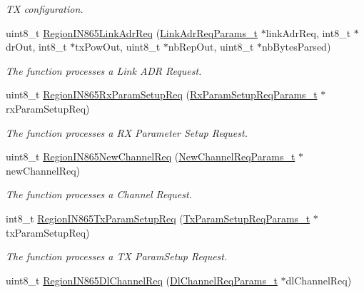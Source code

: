 \begin{DoxyCompactItemize}
\begin{DoxyCompactList}\small\item\em TX configuration. \end{DoxyCompactList}\item 
uint8\+\_\+t \mbox{\hyperlink{group___r_e_g_i_o_n_i_n865_ga97f6332c9583f63e5bbb00b123d80698}{Region\+I\+N865\+Link\+Adr\+Req}} (\mbox{\hyperlink{group___r_e_g_i_o_n_gad4af503e8d4de1846129e26a799a1e8e}{Link\+Adr\+Req\+Params\+\_\+t}} $\ast$link\+Adr\+Req, int8\+\_\+t $\ast$dr\+Out, int8\+\_\+t $\ast$tx\+Pow\+Out, uint8\+\_\+t $\ast$nb\+Rep\+Out, uint8\+\_\+t $\ast$nb\+Bytes\+Parsed)
\begin{DoxyCompactList}\small\item\em The function processes a Link A\+DR Request. \end{DoxyCompactList}\item 
uint8\+\_\+t \mbox{\hyperlink{group___r_e_g_i_o_n_i_n865_gae9b5d8d395685af5802a07527f6cd3f3}{Region\+I\+N865\+Rx\+Param\+Setup\+Req}} (\mbox{\hyperlink{group___r_e_g_i_o_n_ga7165f282c670c728c36d534df2285157}{Rx\+Param\+Setup\+Req\+Params\+\_\+t}} $\ast$rx\+Param\+Setup\+Req)
\begin{DoxyCompactList}\small\item\em The function processes a RX Parameter Setup Request. \end{DoxyCompactList}\item 
uint8\+\_\+t \mbox{\hyperlink{group___r_e_g_i_o_n_i_n865_ga5448e91593496677753ad6600cedadc5}{Region\+I\+N865\+New\+Channel\+Req}} (\mbox{\hyperlink{group___r_e_g_i_o_n_gae2abcdb6dbb843c9faf5fd3009eca9d6}{New\+Channel\+Req\+Params\+\_\+t}} $\ast$new\+Channel\+Req)
\begin{DoxyCompactList}\small\item\em The function processes a Channel Request. \end{DoxyCompactList}\item 
int8\+\_\+t \mbox{\hyperlink{group___r_e_g_i_o_n_i_n865_gae55f89703bdc3e0b2f2968dfa8d40b6e}{Region\+I\+N865\+Tx\+Param\+Setup\+Req}} (\mbox{\hyperlink{group___r_e_g_i_o_n_ga26836ef2996e70410e42ef471073f855}{Tx\+Param\+Setup\+Req\+Params\+\_\+t}} $\ast$tx\+Param\+Setup\+Req)
\begin{DoxyCompactList}\small\item\em The function processes a TX Param\+Setup Request. \end{DoxyCompactList}\item 
uint8\+\_\+t \mbox{\hyperlink{group___r_e_g_i_o_n_i_n865_ga03ea7893369c0a1907cbae27484c485a}{Region\+I\+N865\+Dl\+Channel\+Req}} (\mbox{\hyperlink{group___r_e_g_i_o_n_gae0d608ff1f8ea0a430e4f9a4c38ec7f3}{Dl\+Channel\+Req\+Params\+\_\+t}} $\ast$dl\+Channel\+Req)

\end{DoxyCompactItemize}
